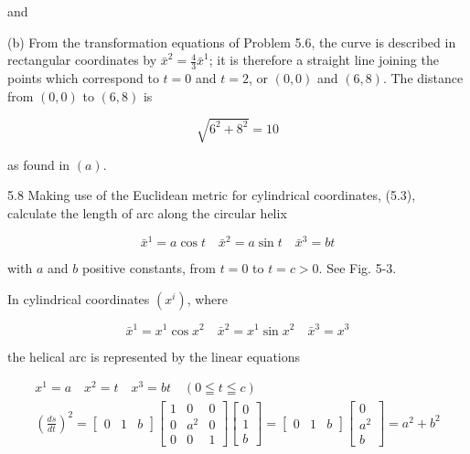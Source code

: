 \documentclass[10pt]{article}
\begin{document}
and

(b) From the transformation equations of Problem 5.6, the curve is described in rectangular coordinates by $\bar{x}^{2}=\frac{4}{3} \bar{x}^{1}$; it is therefore a straight line joining the points which correspond to $t=0$ and $t=2$, or $(0,0)$ and $(6,8)$. The distance from $(0,0)$ to $(6,8)$ is

$$
\sqrt{6^{2}+8^{2}}=10
$$

as found in $(a)$.

5.8 Making use of the Euclidean metric for cylindrical coordinates, (5.3), calculate the length of arc along the circular helix

$$
\bar{x}^{1}=a \cos t \quad \bar{x}^{2}=a \sin t \quad \bar{x}^{3}=b t
$$

with $a$ and $b$ positive constants, from $t=0$ to $t=c>0$. See Fig. 5-3.

In cylindrical coordinates $\left(x^{i}\right)$, where

$$
\bar{x}^{1}=x^{1} \cos x^{2} \quad \bar{x}^{2}=x^{1} \sin x^{2} \quad \bar{x}^{3}=x^{3}
$$

the helical arc is represented by the linear equations

$$
\begin{gathered}
x^{1}=a \quad x^{2}=t \quad x^{3}=b t \quad(0 \leqq t \leqq c) \\
\left(\frac{d s}{d t}\right)^{2}=\left[\begin{array}{lll}
0 & 1 & b
\end{array}\right]\left[\begin{array}{ccc}
1 & 0 & 0 \\
0 & a^{2} & 0 \\
0 & 0 & 1
\end{array}\right]\left[\begin{array}{l}
0 \\
1 \\
b
\end{array}\right]=\left[\begin{array}{lll}
0 & 1 & b
\end{array}\right]\left[\begin{array}{c}
0 \\
a^{2} \\
b
\end{array}\right]=a^{2}+b^{2}
\end{gathered}
$$
\end{document}
